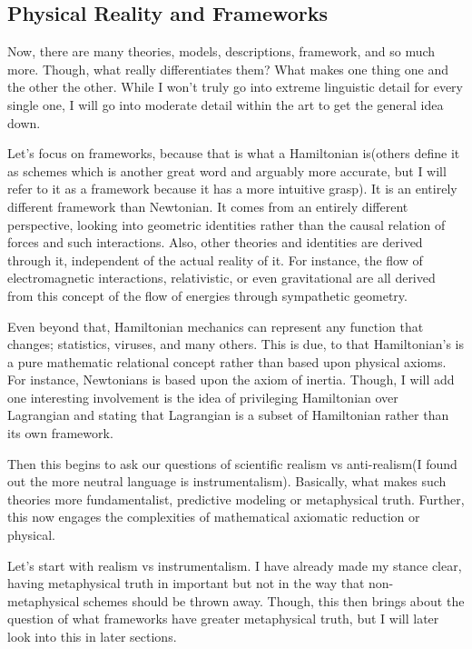 \subsection{Physical Reality and Frameworks}
\par Now, there are many theories, models, descriptions, framework, and so much more. Though, what really differentiates them? What makes one thing one and the other the other. While I won't truly go into extreme linguistic detail for every single one, I will go into moderate detail within the art to get the general idea down.
\par Let's focus on frameworks, because that is what a Hamiltonian is(others define it as schemes which is another great word and arguably more accurate, but I will refer to it as a framework because it has a more intuitive grasp). It is an entirely different framework than Newtonian. It comes from an entirely different perspective, looking into geometric identities rather than the causal relation of forces and such interactions. Also, other theories and identities are derived through it, independent of the actual reality of it. For instance, the flow of electromagnetic interactions, relativistic, or even gravitational are all derived from this concept of the flow of energies through sympathetic geometry. 
\par Even beyond that, Hamiltonian mechanics can represent any function that changes; statistics, viruses, and many others. This is due, to that Hamiltonian's is a pure mathematic relational concept rather than based upon physical axioms. For instance, Newtonians is based upon the axiom of inertia. Though, I will add one interesting involvement is the idea of privileging Hamiltonian over Lagrangian and stating that Lagrangian is a subset of Hamiltonian rather than its own framework.
\par Then this begins to ask our questions of scientific realism vs anti-realism(I found out the more neutral language is instrumentalism). Basically, what makes such theories more fundamentalist, predictive modeling or metaphysical truth. Further, this now engages the complexities of mathematical axiomatic reduction or physical.
\par Let's start with realism vs instrumentalism. I have already made my stance clear, having metaphysical truth in important but not in the way that non-metaphysical schemes should be thrown away. Though, this then brings about the question of what frameworks have greater metaphysical truth, but I will later look into this in later sections. 
